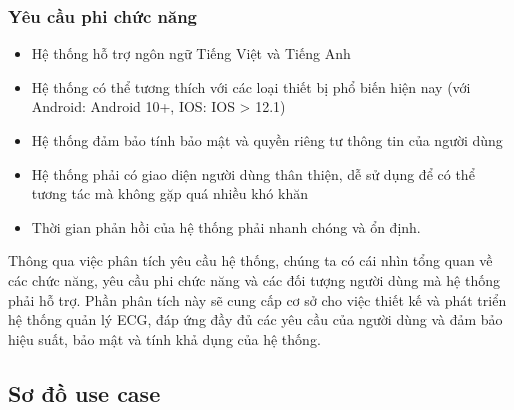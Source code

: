 \subsubsection{Yêu cầu phi chức năng}
\begin{itemize}
    \item Hệ thống hỗ trợ ngôn ngữ Tiếng Việt và Tiếng Anh
    \item Hệ thống có thể tương thích với các loại thiết bị phổ biến hiện nay (với Android: Android 10+, IOS: IOS > 12.1)
    \item Hệ thống đảm bảo tính bảo mật và quyền riêng tư thông tin của người dùng
    \item Hệ thống phải có giao diện người dùng thân thiện, dễ sử dụng để có thể tương tác mà không gặp quá nhiều khó khăn
    \item Thời gian phản hồi của hệ thống phải nhanh chóng và ổn định.
\end{itemize}

Thông qua việc phân tích yêu cầu hệ thống, chúng ta có cái nhìn tổng quan về các chức năng, yêu cầu phi chức năng và 
các đối tượng người dùng mà hệ thống phải hỗ trợ. Phần phân tích này sẽ cung cấp cơ sở cho việc thiết kế và phát triển hệ thống quản lý ECG, 
đáp ứng đầy đủ các yêu cầu của người dùng và đảm bảo hiệu suất, bảo mật và tính khả dụng của hệ thống.

\subsection{Sơ đồ use case}
